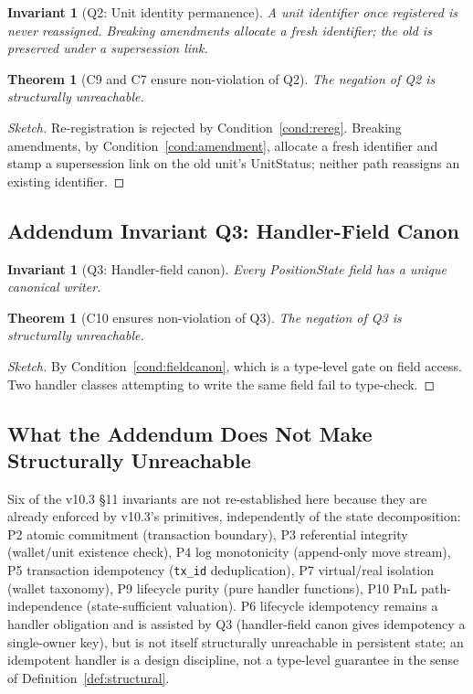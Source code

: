 \documentclass[11pt,a4paper]{article}
\newtheorem{theorem}[definition]{Theorem}
\newtheorem{invariant}[definition]{Invariant}
\begin{document}
\begin{invariant}[Q2: Unit identity permanence]\label{inv:q2}
A unit identifier once registered is never reassigned. Breaking amendments allocate a fresh identifier; the old is preserved under a supersession link.
\end{invariant}

\begin{theorem}[C9 and C7 ensure non-violation of Q2]
The negation of Q2 is structurally unreachable.
\end{theorem}

\begin{proof}[Sketch]
Re-registration is rejected by Condition~\ref{cond:rereg}. Breaking amendments, by Condition~\ref{cond:amendment}, allocate a fresh identifier and stamp a supersession link on the old unit's UnitStatus; neither path reassigns an existing identifier.
\end{proof}

\subsection{Addendum Invariant Q3: Handler-Field Canon}

\begin{invariant}[Q3: Handler-field canon]\label{inv:q3}
Every PositionState field has a unique canonical writer.
\end{invariant}

\begin{theorem}[C10 ensures non-violation of Q3]
The negation of Q3 is structurally unreachable.
\end{theorem}

\begin{proof}[Sketch]
By Condition~\ref{cond:fieldcanon}, which is a type-level gate on field access. Two handler classes attempting to write the same field fail to type-check.
\end{proof}

\subsection{What the Addendum Does Not Make Structurally Unreachable}

Six of the v10.3 \S 11 invariants are not re-established here because they are already enforced by v10.3's primitives, independently of the state decomposition: P2 atomic commitment (transaction boundary), P3 referential integrity (wallet/unit existence check), P4 log monotonicity (append-only move stream), P5 transaction idempotency (\texttt{tx\_id} deduplication), P7 virtual/real isolation (wallet taxonomy), P9 lifecycle purity (pure handler functions), P10 PnL path-independence (state-sufficient valuation). P6 lifecycle idempotency remains a handler obligation and is assisted by Q3 (handler-field canon gives idempotency a single-owner key), but is not itself structurally unreachable in persistent state; an idempotent handler is a design discipline, not a type-level guarantee in the sense of Definition~\ref{def:structural}.
\end{document}
